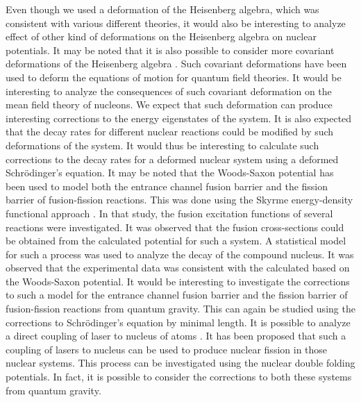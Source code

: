 \documentclass[12pt]{article}
\begin{document}
Even though we used a deformation of the Heisenberg algebra, which was consistent with various different theories, it would also be interesting to analyze effect of other kind of deformations on the Heisenberg algebra on nuclear potentials. It may be noted that it is also possible to consider more covariant deformations of the Heisenberg algebra \cite{qft2,qft4,qft5,qft6,qft7}.  Such covariant deformations have been used to deform the equations of motion for quantum field theories. It would be interesting to analyze the consequences of such covariant deformation on the mean field theory of nucleons. We expect that such deformation can produce interesting corrections to the energy eigenstates of the system. It is also expected that the decay rates for different nuclear reactions could be modified by such deformations of the system. It would thus be interesting to calculate such corrections to the decay rates for a deformed nuclear system using a deformed Schr\"{o}dinger's equation. It may be noted that the Woods-Saxon potential has been used to model both the entrance channel fusion barrier and the fission barrier of fusion-fission reactions. This was done using the Skyrme energy-density functional approach \cite{fusion1,fusion2}. In that study, the fusion excitation functions of several reactions were investigated. It was observed that the fusion cross-sections could be obtained from the calculated potential for such a system. A statistical model for such a process was used to analyze the decay of the compound nucleus. It was observed that the experimental data was consistent with the calculated based on the Woods-Saxon potential. It would be interesting to investigate the corrections to such a model for the entrance channel fusion barrier and the fission barrier of fusion-fission reactions from quantum gravity. This can again be studied using the corrections to Schr\"{o}dinger's equation by minimal length. It is possible to analyze a direct coupling of laser to nucleus of atoms \cite{laser1,laser2,laser4,laser5}. It has been proposed that such a coupling of lasers to nucleus can be used to produce nuclear fission in those nuclear systems. This process can be investigated using the nuclear double folding potentials. In fact, it is possible to consider the corrections to both these systems from quantum gravity. 
  
\end{document}
